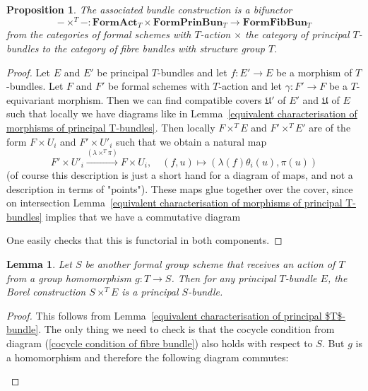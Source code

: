 \documentclass[11pt,oneside]{amsart}
\newtheorem{lemma}[theorem]{Lemma}
\newtheorem{proposition}[theorem]{Proposition}
\theoremstyle{definition}
\theoremstyle{remark}
\begin{document}
	\begin{proposition}\label{associated bundle construction is bifunctor}
		The associated bundle construction is a bifunctor \[-\times^T-:\mathbf{FormAct}_T\times \mathbf{FormPrinBun}_T\rightarrow \mathbf{FormFibBun}_T\] 
		from the categories of formal schemes with $T$-action $\times$ the category of principal $T$-bundles to the category of fibre bundles with structure group $T$.
	\end{proposition}
	\begin{proof}
		Let $E$ and $E'$ be principal $T$-bundles and let $f:E'\rightarrow E$ be a morphism of $T$-bundles. Let $F$ and $F'$ be formal schemes with $T$-action and let $\gamma:F'\rightarrow F$ be a $T$-equivariant morphism. Then we can find compatible covers $\mathfrak U'$ of $E'$ and $\mathfrak U$ of $E$ such that locally we have diagrams like in Lemma~\ref{equivalent characterisation of morphisms of principal T-bundles}. Then locally $F\times^T E$ and $F'\times^T E'$ are of the form $F\times U_i$ and $F'\times U'_i$ such that we obtain a natural map
		\[F'\times U'_i\xrightarrow{(\lambda\times^T\pi)} F\times U_i, \quad (f,u)\mapsto (\lambda(f)\theta_i(u),\pi(u))\]
		(of course this description is just a short hand for a diagram of maps, and not a description in terms of "points"). These maps glue together over the cover, since on intersection Lemma~\ref{equivalent characterisation of morphisms of principal T-bundles} implies that we have a commutative diagram
		\begin{center}
		\end{center}
		One easily checks that this is functorial in both components.
	\end{proof}
	
	\begin{lemma}
		Let $S$ be another formal group scheme that receives an action of $T$ from a group homomorphism $g:T\rightarrow S$. Then for any principal $T$-bundle $E$, the Borel construction $S\times^T E$ is a principal $S$-bundle.
	\end{lemma}
	\begin{proof}
		This follows from Lemma~\ref{equivalent characterisation of principal $T$-bundle}. The only thing we need to check is that the cocycle condition from diagram (\ref{cocycle condition of fibre bundle}) also holds with respect to $S$. But $g$ is a homomorphism and therefore the following diagram commutes:
		\begin{center}
		\end{center}
		
		
	\end{proof}
	
\end{document}

